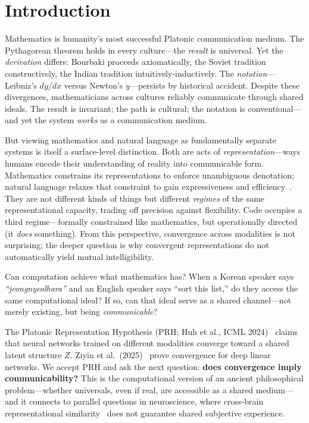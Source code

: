 \documentclass{article}
\theoremstyle{definition}
\begin{document}

\section{Introduction}\label{sec:intro}

Mathematics is humanity's most successful Platonic communication medium. The Pythagorean theorem holds in every culture---the \emph{result} is universal. Yet the \emph{derivation} differs: Bourbaki proceeds axiomatically, the Soviet tradition constructively, the Indian tradition intuitively-inductively. The \emph{notation}---Leibniz's $dy/dx$ versus Newton's $\dot{y}$---persists by historical accident. Despite these divergences, mathematicians across cultures reliably communicate through shared ideals. The result is invariant; the path is cultural; the notation is conventional---and yet the system \emph{works} as a communication medium.

But viewing mathematics and natural language as fundamentally separate systems is itself a surface-level distinction. Both are acts of \emph{representation}---ways humans encode their understanding of reality into communicable form. Mathematics constrains its representations to enforce unambiguous denotation; natural language relaxes that constraint to gain expressiveness and efficiency~\citep{piantadosi2012ambiguity}. They are not different kinds of things but different \emph{regimes} of the same representational capacity, trading off precision against flexibility. Code occupies a third regime---formally constrained like mathematics, but operationally directed (it \emph{does} something). From this perspective, convergence across modalities is not surprising; the deeper question is why convergent representations do not automatically yield mutual intelligibility.

Can computation achieve what mathematics has? When a Korean speaker says \emph{``jeongnyeolhara''} and an English speaker says ``sort this list,'' do they access the same computational ideal? If so, can that ideal serve as a shared channel---not merely existing, but being \emph{communicable}?

The Platonic Representation Hypothesis (PRH; Huh et al., ICML 2024)~\citep{huh2024platonic} claims that neural networks trained on different modalities converge toward a shared latent structure $Z$. Ziyin et al.\ (2025)~\citep{ziyin2025proof} prove convergence for deep linear networks. We accept PRH and ask the next question: \textbf{does convergence imply communicability?} This is the computational version of an ancient philosophical problem---whether universals, even if real, are accessible as a shared medium---and it connects to parallel questions in neuroscience, where cross-brain representational similarity~\citep{haxby2011hyperalignment} does not guarantee shared subjective experience.
\end{document}
